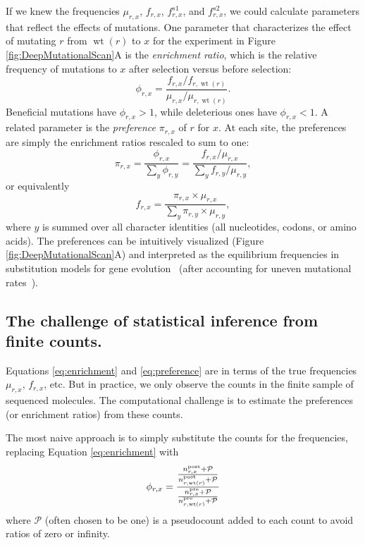 \documentclass[twocolumn]{bmcart}%
\begin{document}
If we knew the frequencies $\mu_{r,x}$, $f_{r,x}$, $f_{r,x}^{s1}$, and $f_{r,x}^{s2}$, we could calculate parameters that reflect the effects of mutations. One parameter that characterizes the effect of mutating $r$ from $\operatorname{wt}\left(r\right)$ to $x$ for the experiment in Figure \ref{fig:DeepMutationalScan}A is the \emph{enrichment ratio}, which is the relative frequency of mutations to $x$ after selection versus before selection:
\begin{equation}
\label{eq:enrichment}
\phi_{r,x} = \frac{f_{r,x} / f_{r,\operatorname{wt}\left(r\right)}}{\mu_{r,x} / \mu_{r,\operatorname{wt}\left(r\right)}}.
\end{equation}
Beneficial mutations have $\phi_{r,x} > 1$, while deleterious ones have $\phi_{r,x} < 1$. A related parameter is the \emph{preference} $\pi_{r,x}$ of $r$ for $x$. At each site, the preferences are simply the enrichment ratios rescaled to sum to one:
\begin{equation}
\label{eq:preference}
\pi_{r,x} = \frac{\phi_{r,x}}{\sum_y \phi_{r,y}} = \frac{f_{r,x} / \mu_{r,x}}{\sum_y f_{r,y} / \mu_{r,y}},
\end{equation}
or equivalently
\begin{equation}
\label{eq:preference2}
f_{r,x} = \frac{\pi_{r,x} \times \mu_{r,x}}{\sum_y \pi_{r,y} \times \mu_{r,y}},
\end{equation}
where $y$ is summed over all character identities (all nucleotides, codons, or amino acids).
The preferences can be intuitively visualized (Figure \ref{fig:DeepMutationalScan}A) and interpreted as the equilibrium frequencies in substitution models for gene evolution~\cite{bloom2014experimentally,bloom2014informed} (after accounting for uneven mutational rates~\cite{yampolsky2005exchangeability,stoltzfus2009climbing}). 

\subsection*{The challenge of statistical inference from finite counts.}
Equations \ref{eq:enrichment} and \ref{eq:preference} are in terms of the true frequencies $\mu_{r,x}$, $f_{r,x}$, etc. But in practice, we only observe the counts in the finite sample of sequenced molecules. The computational challenge is to estimate the preferences (or enrichment ratios) from these counts.

The most naive approach is to simply substitute the counts for the frequencies, replacing Equation \ref{eq:enrichment} with
\begin{equation}
\label{eq:enrichmentcounts}
\phi_{r,x} = \frac{\frac{n_{r,x}^{\rm{post}} + \mathcal{P}}{n_{r,\operatorname{wt}\left(r\right)}^{\rm{post}} + \mathcal{P}}}{\frac{n_{r,x}^{\rm{pre}} + \mathcal{P}}{n_{r,\operatorname{wt}\left(r\right)}^{\rm{pre}} + \mathcal{P}}}
\end{equation}
where $\mathcal{P}$ (often chosen to be one) is a pseudocount added to each count to avoid ratios of zero or infinity.
\end{document}

